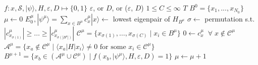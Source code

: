 \documentclass[
  reprint,            %
  amsmath,amssymb,
  aps,
  superscriptaddress, %
  longbibliography
]{revtex4-2}
\theoremstyle{definition}
\begin{document}
\begin{algorithm}[H]
\caption{Diagonalization-based iterative sparse solver}\label{alg:SCI}
\begin{algorithmic}[1]
    \Require $f: x, \mathcal{S}, |\psi\rangle, H, \varepsilon, D \mapsto \{0, 1\}$ 
    \Require $\varepsilon$, or $D$, or ($\varepsilon$, $D$) 
    \Require $1\leq C \leq \infty$ 
    \Require $T$ 
    \Require $B^0 = \{ x_1, ..., x_{N_0}\}$ 
    \State $\mu \gets 0$ 
    \State $E_0^{\mu}, |\psi^\mu\rangle = \sum_{x\in B^\mu} c^{\mu}_x | x\rangle \gets$ lowest eigenpair of $H_{B^{\mu}}$ 
    \State $\sigma \gets$ permutation s.t. $|c^\mu_{x_{\sigma(1)}}|\ge\hdots \ge |c^\mu_{x_{\sigma(|B^\mu|)}}|$ 
    \State $\mathcal{C}^\mu = \{x_{\sigma(1)}, \hdots, x_{\sigma(C)}\; | \; x_i \in B^\mu\}$ 
    \State $0 \gets c^\mu_x\;\;\forall \; x \notin \mathcal{C}^\mu$ 
    \State $\mathcal{A}^\mu = \{x_a \notin \mathcal{C}^\mu \; | \; \langle x_a | H | x_i \rangle \neq 0 \textrm{ for some } x_i \in \mathcal{C}^\mu\}$ 
    \State $B^{\mu + 1} = \{x_b \in (\mathcal{A}^\mu \cup \mathcal{C}^\mu) \; | \; f(x_b, |\psi^\mu\rangle, H, \varepsilon, D) = 1 \}$ 
    \State $\mu \gets \mu + 1$
\EndWhile
\end{algorithmic}
\end{algorithm}
\end{document}
